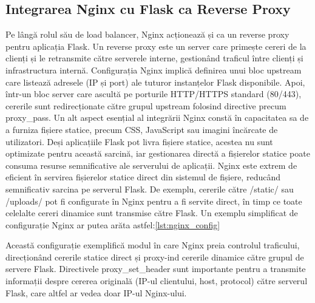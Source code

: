 \documentclass[12pt, a4paper, oneside, romanian]{teza-upb}
\begin{document}
\subsection*{Integrarea Nginx cu Flask ca Reverse Proxy}
Pe lângă rolul său de load balancer, Nginx acționează și ca un reverse proxy pentru aplicația Flask. Un reverse proxy este un server care primește cereri de la clienți și le retransmite către serverele interne, gestionând traficul între clienți și infrastructura internă. Configurația Nginx implică definirea unui bloc upstream care listează adresele (IP și port) ale tuturor instanțelor Flask disponibile. Apoi, într-un bloc server care ascultă pe porturile HTTP/HTTPS standard (80/443), cererile sunt redirecționate către grupul upstream folosind directive precum proxy\_pass. Un alt aspect esențial al integrării Nginx constă în capacitatea sa de a furniza fișiere statice, precum CSS, JavaScript sau imagini încărcate de utilizatori. Deși aplicațiile Flask pot livra fișiere statice, acestea nu sunt optimizate pentru această sarcină, iar gestionarea directă a fișierelor statice poate consuma resurse semnificative ale serverului de aplicații. Nginx este extrem de eficient în servirea fișierelor statice direct din sistemul de fișiere, reducând semnificativ sarcina pe serverul Flask. De exemplu, cererile către /static/ sau /uploads/ pot fi configurate în Nginx pentru a fi servite direct, în timp ce toate celelalte cereri dinamice sunt transmise către Flask. 
Un exemplu simplificat de configurație Nginx ar putea arăta astfel:\ref{lst:nginx_config}


Această configurație exemplifică modul în care Nginx preia controlul traficului, direcționând cererile statice direct și proxy-ind cererile dinamice către grupul de servere Flask. Directivele proxy\_set\_header sunt importante pentru a transmite informații despre cererea originală (IP-ul clientului, host, protocol) către serverul Flask, care altfel ar vedea doar IP-ul Nginx-ului.
\end{document}
